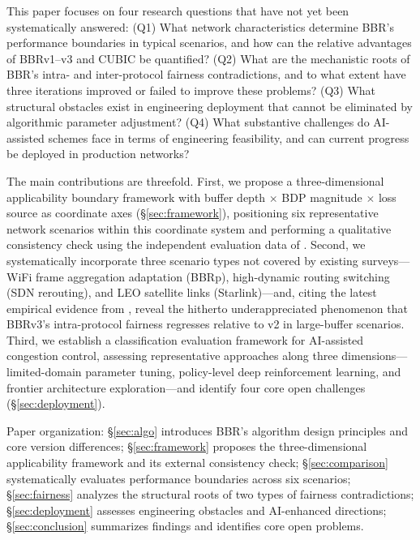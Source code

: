 \documentclass[a4paper,fleqn]{cas-sc}
\begin{document}
This paper focuses on four research questions that have not yet been
systematically answered: (Q1) What network characteristics determine BBR's
performance boundaries in typical scenarios, and how can the relative
advantages of BBRv1--v3 and CUBIC be quantified? (Q2) What are the mechanistic
roots of BBR's intra- and inter-protocol fairness contradictions, and to what
extent have three iterations improved or failed to improve these problems?
(Q3) What structural obstacles exist in engineering deployment that cannot be
eliminated by algorithmic parameter adjustment? (Q4) What substantive challenges
do AI-assisted schemes face in terms of engineering feasibility, and can current
progress be deployed in production networks?

The main contributions are threefold. First, we propose a three-dimensional
applicability boundary framework with buffer depth $\times$ BDP magnitude
$\times$ loss source as coordinate axes (\S\ref{sec:framework}), positioning
six representative network scenarios within this coordinate system and performing
a qualitative consistency check using the independent evaluation data of
\citet{scholz2018deeper}. Second, we systematically incorporate three scenario
types not covered by existing surveys---WiFi frame aggregation adaptation (BBRp),
high-dynamic routing switching (SDN rerouting), and LEO satellite links
(Starlink)---and, citing the latest empirical evidence from
\citet{piotrowska2024}, reveal the hitherto underappreciated phenomenon that
BBRv3's intra-protocol fairness regresses relative to v2 in large-buffer
scenarios. Third, we establish a classification evaluation framework for
AI-assisted congestion control, assessing representative approaches along three
dimensions---limited-domain parameter tuning, policy-level deep reinforcement
learning, and frontier architecture exploration---and identify four core open
challenges (\S\ref{sec:deployment}).

Paper organization: \S\ref{sec:algo} introduces BBR's algorithm design
principles and core version differences; \S\ref{sec:framework} proposes the
three-dimensional applicability framework and its external consistency check;
\S\ref{sec:comparison} systematically evaluates performance boundaries across
six scenarios; \S\ref{sec:fairness} analyzes the structural roots of two types
of fairness contradictions; \S\ref{sec:deployment} assesses engineering obstacles
and AI-enhanced directions; \S\ref{sec:conclusion} summarizes findings and
identifies core open problems.

\end{document}
